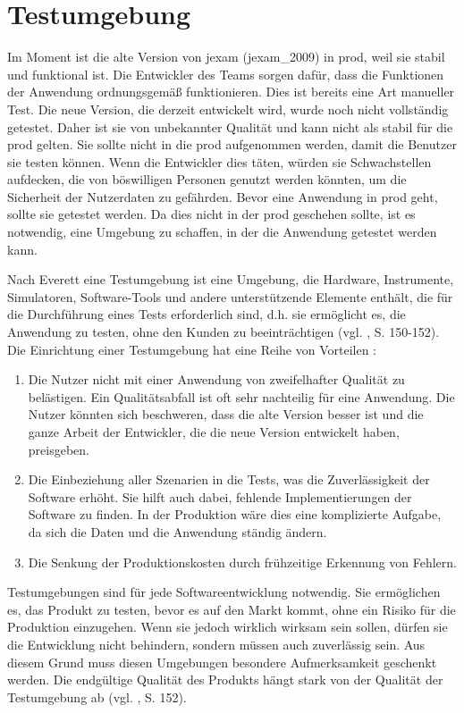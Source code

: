 \section{Testumgebung}

Im Moment ist die alte Version von jexam (\Gls{jexam_2009})
in \Gls{prod}, weil sie stabil und funktional ist.
Die Entwickler des Teams sorgen dafür, dass die
Funktionen der Anwendung ordnungsgemäß funktionieren.
Dies ist bereits eine Art manueller Test. Die neue
Version, die derzeit entwickelt wird, wurde noch nicht
vollständig getestet. Daher ist sie von unbekannter
Qualität und kann nicht als stabil für die \Gls{prod}
gelten. Sie sollte nicht in die \Gls{prod} aufgenommen
werden, damit die Benutzer sie testen können.  Wenn
die Entwickler dies täten, würden sie Schwachstellen
aufdecken, die von böswilligen Personen genutzt werden
könnten, um die Sicherheit der Nutzerdaten zu
gefährden. Bevor eine Anwendung in \Gls{prod} geht,
sollte sie getestet werden. Da dies nicht in der
\Gls{prod} geschehen sollte, ist es notwendig, eine
Umgebung zu schaffen, in der die Anwendung getestet
werden kann.


Nach Everett eine Testumgebung ist eine Umgebung,
die Hardware, Instrumente, Simulatoren, Software-Tools
und andere unterstützende Elemente enthält, die für
die Durchführung eines Tests erforderlich sind,
d.h. sie ermöglicht es, die Anwendung zu testen, ohne
den Kunden zu beeinträchtigen (vgl. \cite{shultz2011software}, S. 150-152).
Die Einrichtung einer Testumgebung hat eine Reihe von Vorteilen :

\noindent
\begin{enumerate}
    \item Die Nutzer nicht mit einer Anwendung von
    zweifelhafter Qualität zu belästigen. Ein
    Qualitätsabfall ist oft sehr nachteilig für eine
    Anwendung. Die Nutzer könnten sich beschweren,
    dass die alte Version besser ist und die ganze
    Arbeit der Entwickler, die die neue Version
    entwickelt haben, preisgeben.

    \item Die Einbeziehung aller Szenarien in die
    Tests, was die Zuverlässigkeit der Software
    erhöht. Sie hilft auch dabei, fehlende
    Implementierungen der Software zu finden. In der
    Produktion wäre dies eine komplizierte Aufgabe, da
    sich die Daten und die Anwendung ständig ändern.

    \item Die Senkung der Produktionskosten durch
    frühzeitige Erkennung von Fehlern.

\end{enumerate}

Testumgebungen sind für jede Softwareentwicklung
notwendig. Sie ermöglichen es, das Produkt zu testen,
bevor es auf den Markt kommt, ohne ein Risiko für die
Produktion einzugehen. Wenn sie jedoch wirklich
wirksam sein sollen, dürfen sie die Entwicklung nicht
behindern, sondern müssen auch zuverlässig sein. Aus
diesem Grund muss diesen Umgebungen besondere
Aufmerksamkeit geschenkt werden. Die endgültige
Qualität des Produkts hängt stark von der Qualität der
Testumgebung ab (vgl. \cite{shultz2011software}, S. 152).

